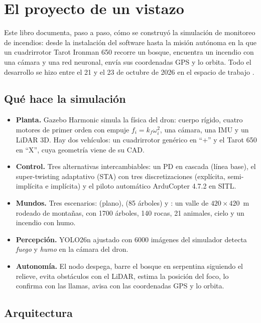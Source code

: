 \chapter{El proyecto de un vistazo}

Este libro documenta, paso a paso, cómo se construyó la simulación de monitoreo de incendios:
desde la instalación del software hasta la misión autónoma en la que un cuadrirrotor
Tarot Ironman 650 recorre un bosque, encuentra un incendio con una cámara y una red neuronal,
envía sus coordenadas GPS y lo orbita. Todo el desarrollo se hizo entre el 21 y el 23 de
octubre de 2026 en el espacio de trabajo .

\section{Qué hace la simulación}

\begin{itemize}
  \item \textbf{Planta.} Gazebo Harmonic simula la física del dron: cuerpo rígido, cuatro
        motores de primer orden con empuje $f_i = k_f\omega_i^2$, una cámara, una IMU y un
        LiDAR 3D. Hay dos vehículos: un cuadrirrotor genérico en ``+'' y el Tarot 650 en ``X'',
        cuya geometría viene de su CAD.
  \item \textbf{Control.} Tres alternativas intercambiables: un PD en cascada (línea base),
        el super-twisting adaptativo (STA) con tres discretizaciones (explícita,
        semi-implícita e implícita) y el piloto automático ArduCopter 4.7.2 en SITL.
  \item \textbf{Mundos.} Tres escenarios:  (plano),  (85 árboles) y
        : un valle de $420\times420$~m rodeado de montañas, con 1700 árboles,
        140 rocas, 21 animales, cielo y un incendio con humo.
  \item \textbf{Percepción.} YOLO26n ajustado con 6000 imágenes del simulador detecta
        \emph{fuego} y \emph{humo} en la cámara del dron.
  \item \textbf{Autonomía.} El nodo  despega, barre el bosque en
        serpentina siguiendo el relieve, evita obstáculos con el LiDAR, estima la posición del
        foco, lo confirma con las llamas, avisa con las coordenadas GPS y lo orbita.
\end{itemize}

\section{Arquitectura}

